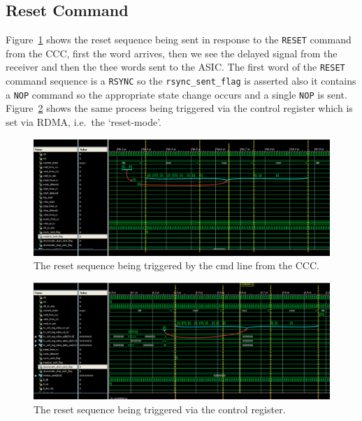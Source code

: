 \subsection{Reset Command} %
\label{sec:reset_command}
Figure~\ref{fig:isim_reset_cmd} shows the reset sequence being sent in response to the \texttt{RESET} command from the CCC, first the word arrives, then we see the delayed signal from the receiver and then the thee words sent to the ASIC. The first word of the \texttt{RESET} command sequence is a \texttt{RSYNC} so the \texttt{rsync\_sent\_flag} is asserted also it contains a \texttt{NOP} command so the appropriate state change occurs and a single \texttt{NOP} is sent. Figure~\ref{fig:isim_reset_rdma} shows the same process being triggered via the control register which is set via RDMA, i.e.\ the `reset-mode'.
\begin{figure}
  \centering
  \includegraphics[width=\textwidth]{images/isim/edited/reset_cmd.png}
  \caption{The reset sequence being triggered by the cmd line from the CCC.}
  \label{fig:isim_reset_cmd}
\end{figure}
\begin{figure}
  \centering
  \includegraphics[width=\textwidth]{images/isim/edited/reset_rdma.png}
  \caption{The reset sequence being triggered via the control register.}
  \label{fig:isim_reset_rdma}
\end{figure}
\clearpage
